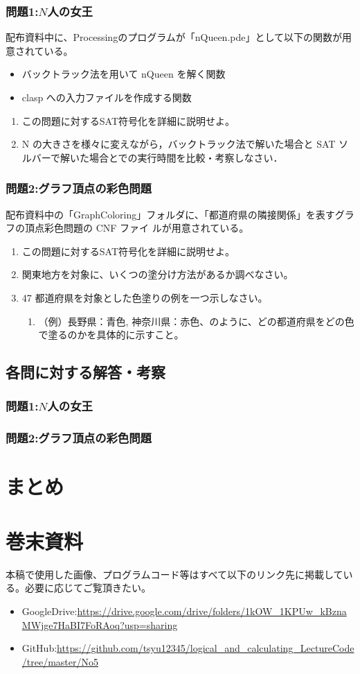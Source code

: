 \documentclass[dvipdfmx]{jsarticle}
\begin{document}
\subsubsection{問題1:$N$人の女王}
配布資料中に、Processingのプログラムが「nQueen.pde」として以下の関数が用意されている。
\begin{itemize}
  \item バックトラック法を用いて nQueen を解く関数
  \item clasp への入力ファイルを作成する関数
\end{itemize}
\begin{enumerate}
  \item この問題に対するSAT符号化を詳細に説明せよ。
  \item N の大きさを様々に変えながら，バックトラック法で解いた場合と SAT ソルバーで解いた場合とでの実行時間を比較・考察しなさい．
\end{enumerate}
\subsubsection{問題2:グラフ頂点の彩色問題}
配布資料中の「GraphColoring」フォルダに、「都道府県の隣接関係」を表すグラフの頂点彩色問題の CNF ファイ
ルが用意されている。
\begin{enumerate}
  \item この問題に対するSAT符号化を詳細に説明せよ。
  \item 関東地方を対象に、いくつの塗分け方法があるか調べなさい。
  \item 47 都道府県を対象とした色塗りの例を一つ示しなさい。
  \begin{enumerate}
    \item （例）長野県：青色, 神奈川県：赤色、のように、どの都道府県をどの色で塗るのかを具体的に示すこと。
  \end{enumerate}
\end{enumerate}
\subsection{各問に対する解答・考察}
\subsubsection{問題1:$N$人の女王}
\subsubsection{問題2:グラフ頂点の彩色問題}
\section{まとめ}
\section{巻末資料}
本稿で使用した画像、プログラムコード等はすべて以下のリンク先に掲載している。必要に応じてご覧頂きたい。
\begin{itemize}
  \item GoogleDrive:\url{https://drive.google.com/drive/folders/1kOW_1KPUw_kBznaMWjge7HaBI7FoRAoq?usp=sharing}
  \item GitHub:\url{https://github.com/tsyu12345/logical_and_calculating_LectureCode/tree/master/No5}
\end{itemize}
\end{document}
